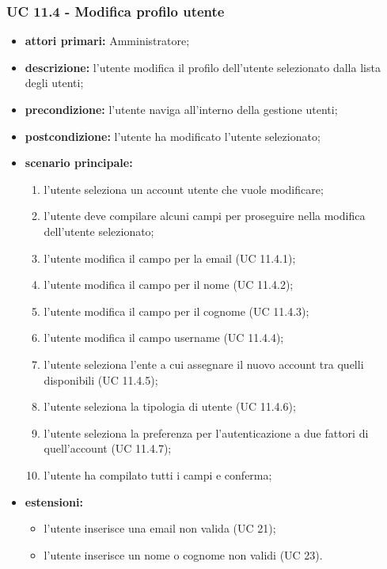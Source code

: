 			\subsubsection{UC 11.4 - Modifica profilo utente}
			\begin{itemize}
				\item \textbf{attori primari:} Amministratore;
				\item \textbf{descrizione:} l'utente modifica il profilo dell'utente selezionato dalla lista degli utenti;
				\item \textbf{precondizione:} l'utente naviga all'interno della gestione utenti;
				\item \textbf{postcondizione:} l'utente ha modificato l'utente selezionato;
				\item \textbf{scenario principale:}
				\begin{enumerate}
					\item l'utente seleziona un account utente che vuole modificare;
					\item l'utente deve compilare alcuni campi per proseguire nella modifica dell'utente selezionato;
					\item{l'utente modifica il campo per la email (UC 11.4.1);}
					\item{l'utente modifica il campo per il nome (UC 11.4.2);}
					\item{l'utente modifica il campo per il cognome (UC 11.4.3);}
					\item{l'utente modifica il campo username  (UC 11.4.4);}
					\item{l'utente seleziona l'ente a cui assegnare il nuovo account tra quelli disponibili (UC 11.4.5);}
					\item{l'utente seleziona la tipologia di utente (UC 11.4.6);}
					\item{l'utente seleziona la preferenza per l'autenticazione a due fattori di quell'account (UC 11.4.7);}
					\item{l'utente ha compilato tutti i campi e conferma;}
				\end{enumerate}	
				\item \textbf{estensioni:}
				\begin{itemize}
					\item l'utente inserisce una email non valida (UC 21);
					\item l'utente inserisce un nome o cognome non validi (UC 23).
				\end{itemize}
			\end{itemize}
			
